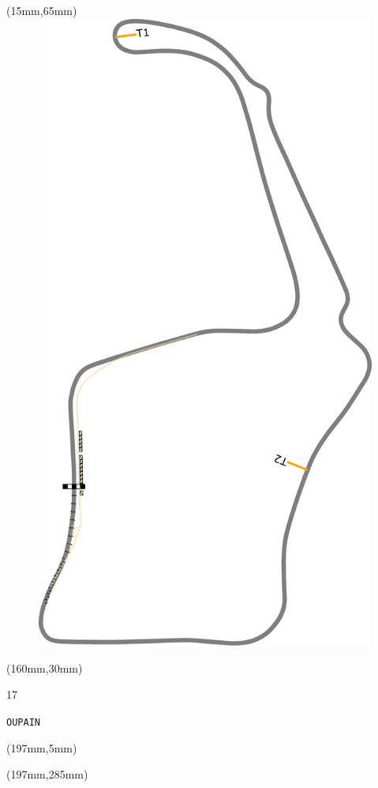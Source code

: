 \begin{textblock*}{185mm}(15mm,65mm)%
\centering
\mbox{\includegraphics[width=185mm,height=210mm,keepaspectratio]{PT/OUPAIN.pdf}}
\end{textblock*}
\begin{textblock*}{40mm}(160mm,30mm)%
\Large
\par{} 
\par17 
\par\hfill\tiny\tt OUPAIN\\
\end{textblock*}
\begin{textblock*}{20mm}(197mm,5mm)%
\fbox{\thepage}
\label{OUPAIN}
\end{textblock*}
\begin{textblock*}{20mm}(197mm,285mm)%
\fbox{\thepage}
\end{textblock*}

